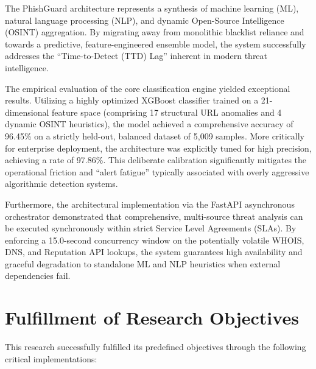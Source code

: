 The PhishGuard architecture represents a synthesis of machine learning
(ML), natural language processing (NLP), and dynamic Open-Source
Intelligence (OSINT) aggregation. By migrating away from monolithic
blacklist reliance and towards a predictive, feature-engineered ensemble
model, the system successfully addresses the ``Time-to-Detect (TTD)
Lag'' inherent in modern threat intelligence.

The empirical evaluation of the core classification engine yielded
exceptional results. Utilizing a highly optimized XGBoost classifier
trained on a 21-dimensional feature space (comprising 17 structural URL
anomalies and 4 dynamic OSINT heuristics), the model achieved a
comprehensive accuracy of 96.45\% on a strictly held-out, balanced
dataset of 5,009 samples. More critically for enterprise deployment, the
architecture was explicitly tuned for high precision, achieving a rate
of 97.86\%. This deliberate calibration significantly mitigates the
operational friction and ``alert fatigue'' typically associated with
overly aggressive algorithmic detection systems.

Furthermore, the architectural implementation via the FastAPI
asynchronous orchestrator demonstrated that comprehensive, multi-source
threat analysis can be executed synchronously within strict Service
Level Agreements (SLAs). By enforcing a 15.0-second concurrency window
on the potentially volatile WHOIS, DNS, and Reputation API lookups, the
system guarantees high availability and graceful degradation to
standalone ML and NLP heuristics when external dependencies fail.

\section{Fulfillment of Research
Objectives}\label{fulfillment-of-research-objectives}

This research successfully fulfilled its predefined objectives through
the following critical implementations:

